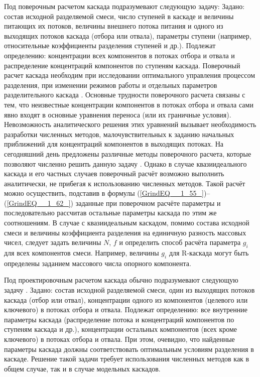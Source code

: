 Под поверочным расчетом каскада подразумевают следующую задачу:
Задано: состав исходной разделяемой смеси, число ступеней в каскаде и величины питающих их потоков, величины внешнего потока питания и одного из выходящих потоков каскада (отбора или отвала), параметры ступени (например, относительные коэффициенты разделения ступеней и др.).
Подлежат определению: концентрации всех компонентов в потоках отбора и отвала и распределение концентраций компонентов по ступеням каскада. 
Поверочный расчет каскада необходим при исследовании оптимального управления процессом разделения, при изменении режимов работы и отдельных параметров разделительного каскада \cite{sulaberidzeTeoriyaKaskadovDlya2011}. Основные трудности поверочного расчета связаны с тем, что неизвестные концентрации компонентов в потоках отбора и отвала сами явно входят в основные уравнения переноса (или их граничные условия). Невозможность аналитического решения этих уравнений вызывает необходимость разработки численных методов, малочувствительных к заданию начальных приближений для концентраций компонентов в выходящих потоках. На сегодняшний день предложены различные методы поверочного расчета, которые позволяют численно решить данную задачу \cite{sulaberidzeTeoriyaKaskadovDlya2011, sazykinUsovershenstvovannyyMetodRascheta1997, wuCalculationMethodsDetermining1988, holpanovEffektivnyyMetodRascheta1998, potapovCalculationSquaredoffCascades1996, zengRobustEfficientCalculation2000}.
Однако в случае квазиидеального каскада и его частных случаев поверочный расчёт возможно выполнить аналитически, не прибегая к использованию численных методов. Такой расчёт можно осуществить, подставив в формулы (\ref{GrindEQ__1_55_})--(\ref{GrindEQ__1_62_}) заданные при поверочном расчёте параметры и последовательно рассчитав остальные параметры каскада по этим же соотношениям. В случае с квазиидеальным каскадом, помимо состава исходной смеси и величины коэффициента разделения на единичную разность массовых чисел, следует задать величины $N$, $f$ и определить способ расчёта параметра $g_{i}$ для всех компонентов смеси. Например, величины $g_{i}$ для R-каскада могут быть определены заданием массового числа опорного компонента.  

Под проектировочным расчетом каскада обычно подразумевают следующую задачу \cite{sulaberidzeTeoriyaKaskadovDlya2011}.
Задано: состав исходной разделяемой смеси, один из выходящих потоков каскада (отбор или отвал), концентрации одного из компонентов (целевого или ключевого) в потоках отбора и отвала.
Подлежат определению: все внутренние параметры каскада (распределение потока и концентраций компонентов по ступеням каскада и др.), концентрации остальных компонентов (всех кроме ключевого) в потоках отбора и отвала. 
При этом, очевидно, что найденные параметры каскада должны соответствовать оптимальным условиям разделения в каскаде. Решение такой задачи требует использования численных методов как в общем случае, так и в случае модельных каскадов. 

